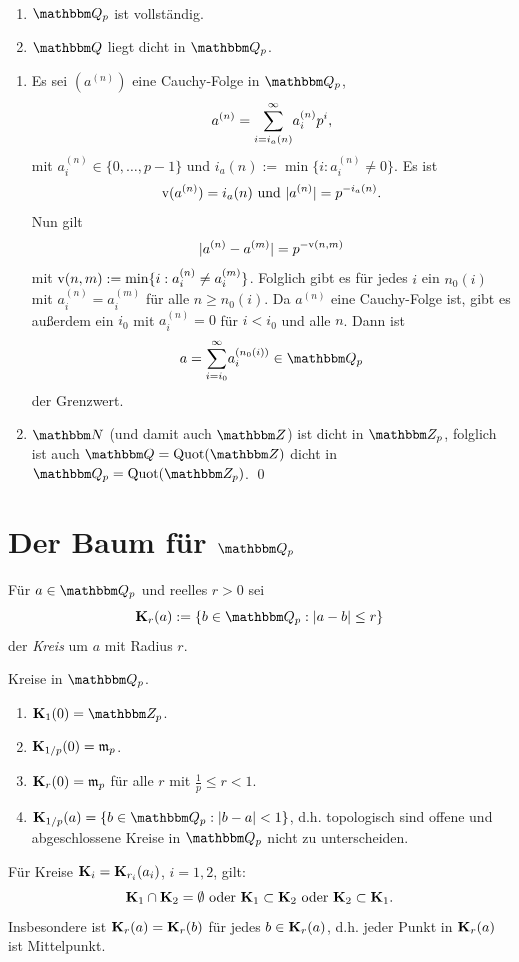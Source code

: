 \documentclass[a4paper, 12pt, twoside]{article}
\begin{document}
\PROP\ \begin{enumerate}
\item $\QQ_p$ ist vollständig.
\item $\QQ$ liegt dicht in $\QQ_p$.
\end{enumerate}
\bew \begin{enumerate}
\item Es sei $(a^{(n)})$ eine Cauchy-Folge in $\QQ_p$,
\[
a^{(n)} = \overset{\infty}{\underset{i=i_a(n)}{\mathop{\sum}}} a_i^{(n)} p^i,
\]
mit $a_i^{(n)}\in\{0,\ldots,p-1\}$ und
$i_a(n):=\min\{i:a^{(n)}_i\neq 0\}$.
Es ist
\[
\mathrm{v}(a^{(n)}) = i_a(n) \text{ und } |a^{(n)}|=p^{-i_a(n)}.
\]
Nun gilt
\[
|a^{(n)}-a^{(m)}| = p^{-\mathrm{v}(n,m)}
\]
mit $\mathrm{v}(n,m):=\min\{i:a_i^{(n)}\neq a_i^{(m)}\}$.
Folglich gibt es für jedes $i$ ein $n_0(i)$ mit $a^{(n)}_i=a^{(m)}_i$
für alle $n\geq n_0(i)$.
Da $a^{(n)}$ eine Cauchy-Folge ist, gibt es außerdem ein $i_0$
mit $a_i^{(n)}=0$ für $i<i_0$ und alle $n$.
Dann ist
\[
a = \SUM{\infty}{i=i_0} a_i^{(n_0(i))} \in \QQ_p
\]
der Grenzwert.
\item $\NN$ (und damit auch $\ZZ$) ist dicht in $\ZZ_p$, 
folglich ist auch $\QQ=\mathrm{Quot}(\ZZ)$ dicht in
$\QQ_p=\mathrm{Quot}(\ZZ_p)$.
\qed
\end{enumerate}

\section{Der Baum für $\QQ_p$}\label{sec_baumQp}

\DEF Für $a\in \QQ_p$ und reelles $r>0$ sei
\[
\KU_r(a) := \{ b\in\QQ_p : |a-b|\leq r \}
\]
der \emph{Kreis}
um $a$ mit Radius $r$.

\BSP Kreise in $\QQ_p$.
\begin{enumerate}
\item $\KU_1(0)=\ZZ_p$.
\item $\mathbf{K}_{1/p}(0)=\mathfrak{m}_p$.
\item $\mathbf{K}_r(0)=\mathfrak{m}_p$ für alle $r$ mit $\frac{1}{p}\leq r < 1$.
\item $\KU_{1/p}(a)=\{ b\in\QQ_p:|b-a|<1 \}$, d.h. topologisch sind
offene und abgeschlossene Kreise in $\QQ_p$ nicht zu unterscheiden.
\end{enumerate}

\BEM Für Kreise $\mathbf{K}_i=\mathbf{K}_{r_i}(a_i)$, $i=1,2$, gilt:
\[
\mathbf{K}_1\cap\mathbf{K}_2=\emptyset\text{ oder }
\mathbf{K}_1\subset \mathbf{K}_2 \text{ oder }
\mathbf{K}_2\subset \mathbf{K}_1.
\]
Insbesondere ist $\mathbf{K}_r(a)=\mathbf{K}_r(b)$ für jedes $b\in\mathbf{K}_r(a)$, d.h.
jeder Punkt in $\mathbf{K}_r(a)$ ist Mittelpunkt.
\end{document}
